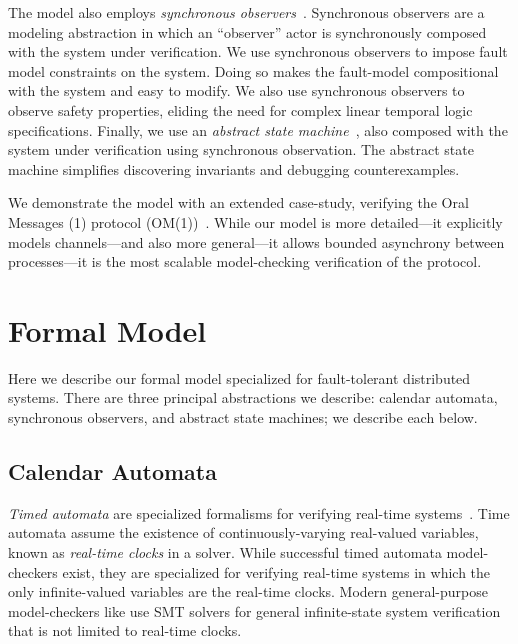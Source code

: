 \documentclass{IEEEtran/IEEEtran}
\newcommand{\lee}[1]{ } %
\newcommand{\lee}[1]{ {\color{blue}$<$lee: #1$>$} } %
\begin{document}
The model also employs \emph{synchronous observers}~\cite{}. Synchronous observers are a modeling abstraction in which an ``observer'' actor is synchronously composed with the system under verification. We use synchronous observers to impose fault model constraints on the system. Doing so makes the fault-model compositional with the system and easy to modify. We also use synchronous observers to observe safety properties, eliding the need for complex linear temporal logic specifications. Finally, we use an \emph{abstract state machine}~\cite{}, also composed with the system under verification using synchronous observation. The abstract state machine simplifies discovering invariants and debugging counterexamples.

We demonstrate the model with an extended case-study, verifying the Oral Messages (1) protocol (OM(1))~\cite{}. While our model is more detailed---it explicitly models channels---and also more general---it allows bounded asynchrony between processes---it is the most scalable model-checking verification of the protocol.

\lee{finish intro...  One more contribution is that we abstract faults using partially interpreted functions in model-checking, which is new? Note focus is on infinite-state model-checking}



\section{Formal Model}\label{sec:model}
Here we describe our formal model specialized for fault-tolerant distributed systems. There are three principal abstractions we describe: calendar automata, synchronous observers, and abstract state machines; we describe each below.

\subsection{Calendar Automata}\label{sec:calendar}\label{sec:calendar}
\emph{Timed automata} are specialized formalisms for verifying real-time systems~\cite{}. Time automata assume the existence of continuously-varying real-valued variables, known as \emph{real-time clocks} in a solver. While successful timed automata model-checkers exist, they are specialized for verifying real-time systems in which the only infinite-valued variables are the real-time clocks. Modern general-purpose model-checkers like \lee{name some} use SMT solvers for general infinite-state system verification that is not limited to real-time clocks.
\end{document}
